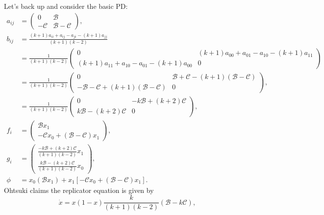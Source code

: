 \documentclass[13pt]{amsart}
\newcommand{\B}{\mathcal{B}}
\newcommand{\C}{\mathcal{C}}
\begin{document}
Let's back up and consider the basic PD:
\begin{equation}
    \begin{split}
        a_{ij} & =
        \begin{pmatrix}
            0 & \B \\
            - \C & \B - \C
        \end{pmatrix},
        \\
        b_{ij} & =
        \frac{(k+1)a_{ii} + a_{ij} - a_{ji} - (k+1)a_{jj}}{(k+1)(k-2)}
        \\
        & = \frac{1}{(k+1)(k-2)}
        \begin{pmatrix}
            0 & (k+1)a_{00} + a_{01} - a_{10} - (k+1)a_{11} \\
            (k+1)a_{11} + a_{10} - a_{01} - (k+1)a_{00} & 0
        \end{pmatrix}
        \\
        & = \frac{1}{(k+1)(k-2)}
        \begin{pmatrix}
            0 & \B + \C - (k+1)(\B - \C) \\
            - \B - \C + (k+1)(\B - \C) & 0
        \end{pmatrix},
        \\
        & = \frac{1}{(k+1)(k-2)}
        \begin{pmatrix}
            0 & -k \B + (k+2) \C \\
            k \B - (k+2) \C & 0
        \end{pmatrix},
        \\
        f_i & =
        \begin{pmatrix}
            \B x_1 \\
            - \C x_0 + (\B - \C) x_1
        \end{pmatrix},
        \\
        g_i & =
        \begin{pmatrix}
            \frac{-k \B + (k+2) \C}{(k+1)(k-2)} x_1 \\
            \frac{k \B - (k+2) \C}{(k+1)(k-2)} x_0
        \end{pmatrix},
        \\
        \phi & = x_0 (\B x_1) + x_1 [-\C x_0 + (\B - \C) x_1].
    \end{split}
\end{equation}
Ohtsuki claims the replicator equation is given by
\begin{equation}
    \dot{x} = x(1-x)\frac{k}{(k+1)(k-2)}(\B - k\C),
\end{equation}
\end{document}
